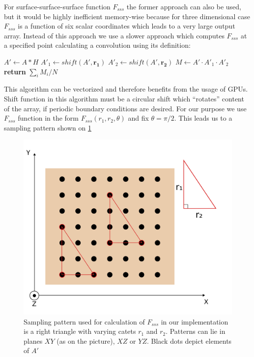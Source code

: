 \documentclass[reprint,amsmath,amssymb,aps,pre,showkeys,showpacs]{revtex4-1}
\begin{document}
For surface-surface-surface function $F_{sss}$ the former approach can also be
used, but it would be highly inefficient memory-wise because for three
dimensional case $F_{sss}$ is a function of six scalar coordinates which leads
to a very large output array. Instead of this approach we use a slower approach
which computes $F_{sss}$ at a specified point calculating a convolution using
its definition:
\begin{algorithmic}[1]
  \State $A' \gets A*H$
  \State $A'_1 \gets shift(A', \bm{r_1})$
  \State $A'_2 \gets shift(A', \bm{r_2})$
  \State $M \gets A' \cdot A'_1 \cdot A'_2$
  \State \textbf{return} $\sum_{i} M_{i} / N$
  \EndProcedure
\end{algorithmic}
This algorithm can be vectorized and therefore benefits from the usage of
GPUs. Shift function in this algorithm must be a circular shift which
``rotates'' content of the array, if periodic boundary conditions are
desired. For our purpose we use $F_{sss}$ function in the form
$F_{sss}(r_1, r_2, \theta)$ and fix $\theta = \pi/2$. This leads us to a
sampling pattern shown on \cref{fig:Fsss-pattern}
\begin{figure}
  \centering
  \includegraphics[width=0.8\linewidth]{images/pattern.png}
  \caption[]{Sampling pattern used for calculation of $F_{sss}$ in our
    implementation is a right triangle with varying catets $r_1$ and
    $r_2$. Patterns can lie in planes $XY$ (as on the picture), $XZ$ or
    $YZ$. Black dots depict elements of $A'$}
  \label{fig:Fsss-pattern}
\end{figure}
\end{document}
